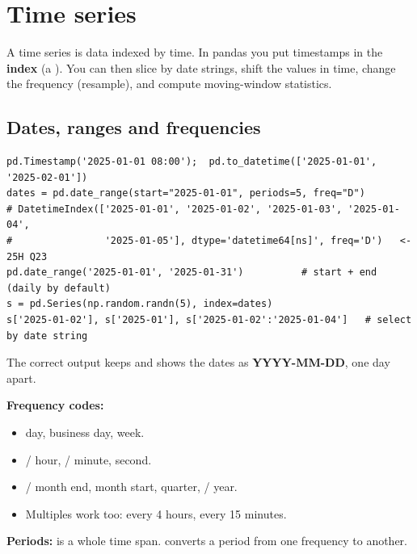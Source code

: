 \newpage
\section{Time series}

\begin{idea}
A time series is data indexed by time. In pandas you put timestamps in the \textbf{index} (a ). You can then slice by date strings, shift the values in time, change the frequency (resample), and compute moving-window statistics.
\end{idea}

\subsection{Dates, ranges and frequencies}
\begin{codebox}
\begin{Verbatim}
pd.Timestamp('2025-01-01 08:00');  pd.to_datetime(['2025-01-01', '2025-02-01'])
dates = pd.date_range(start="2025-01-01", periods=5, freq="D")
# DatetimeIndex(['2025-01-01', '2025-01-02', '2025-01-03', '2025-01-04',
#                '2025-01-05'], dtype='datetime64[ns]', freq='D')   <- 25H Q23
pd.date_range('2025-01-01', '2025-01-31')          # start + end (daily by default)
s = pd.Series(np.random.randn(5), index=dates)
s['2025-01-02'], s['2025-01'], s['2025-01-02':'2025-01-04']   # select by date string
\end{Verbatim}
\end{codebox}
The correct output keeps  and shows the dates as \textbf{YYYY-MM-DD}, one day apart.

\textbf{Frequency codes:}
\begin{itemize}
  \item {} day,  business day,  week.
  \item {}/ hour, / minute,  second.
  \item {}/ month end,  month start,  quarter, / year.
  \item Multiples work too:  every 4 hours,  every 15 minutes.
\end{itemize}
\textbf{Periods:}  is a whole time span.  converts a period from one frequency to another.

